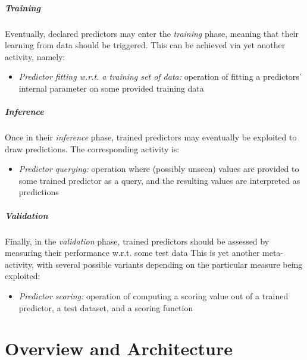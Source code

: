 \documentclass{article}
\begin{document}
\subparagraph{Training}
%
Eventually, declared predictors may enter the \emph{training} phase, meaning that their learning from data should be triggered.
%
This can be achieved via yet another activity, namely:
\begin{itemize}
    \item \emph{Predictor fitting w.r.t. a training set of data:} operation of fitting a predictors' internal parameter on some provided training data
\end{itemize}

\subparagraph{Inference}
%
Once in their \emph{inference} phase, trained predictors may eventually be exploited to draw predictions.
The corresponding activity is:
\begin{itemize}
    \item \emph{Predictor querying:} operation where (possibly unseen) values are provided to some trained predictor as a query, and the resulting values are interpreted as predictions
\end{itemize}

\subparagraph{Validation}
%
Finally, in the \emph{validation} phase, trained predictors should be assessed by measuring their performance w.r.t. some test data
%
This is yet another meta-activity, with several possible variants depending on the particular measure being exploited:
%
\begin{itemize}
    \item \emph{Predictor scoring:} operation of computing a scoring value out of a trained predictor, a test dataset, and a scoring function
\end{itemize}

\section{\mllib{} Overview and Architecture}
\end{document}
